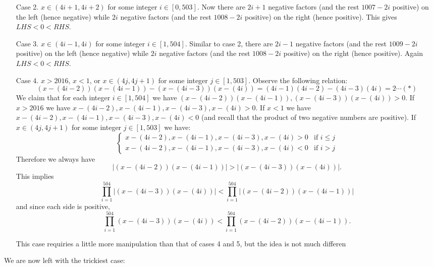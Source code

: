 \documentclass[11pt,a4paper]{article}
\begin{document}
\begin{itemize}
\begin{itemize}
\item [Case 2.] $x\in (4i+1, 4i+2)$ for some integer $i\in [0, 503]$. 
Now there are $2i+1$ negative factors (and the rest $1007-2i$ positive) on the left (hence negative) while $2i$ negative factors (and the rest $1008-2i$ positive) on the right (hence positive). This gives $LHS<0<RHS$.

\item [Case 3.] $x\in (4i-1, 4i)$ for some integer $i\in [1, 504]$. 
Similar to case 2, there are $2i-1$ negative factors (and the rest $1009-2i$ positive) on the left (hence negative) while $2i$ negative factors (and the rest $1008-2i$ positive) on the right (hence positive). 
Again $LHS<0<RHS$. 

\item [Case 4.] $x>2016$, $x<1$, or $x\in (4j, 4j+1)$ for some integer $j\in [1, 503]$. 
Observe the following relation:
$$(x-(4i-2))(x-(4i-1))-(x-(4i-3))(x-(4i))=(4i-1)(4i-2)-(4i-3)(4i)=2\cdots (*)$$ 
We claim that for each integer $i\in [1, 504]$ we have 
$(x-(4i-2))(x-(4i-1)), (x-(4i-3))(x-(4i))>0$. 
If $x>2016$ we have $x-(4i-2), x-(4i-1), x-(4i-3), x-(4i) >0$. 
If $x<1$ we have $x-(4i-2), x-(4i-1), x-(4i-3), x-(4i) <0$ (and recall that the product of two negative numbers are positive). 
If $x\in (4j, 4j+1)$ for some integer $j\in [1, 503]$ we have: 
$$\begin{cases} 
x-(4i-2), x-(4i-1), x-(4i-3), x-(4i) >0 & \text{if } i\le j \\ 
x-(4i-2), x-(4i-1), x-(4i-3), x-(4i) <0 & \text{if } i > j 
\end{cases} $$
Therefore we always have 
$$|(x-(4i-2))(x-(4i-1))|>|(x-(4i-3))(x-(4i))|.$$ 
This implies 
$$\displaystyle\prod_{i=1}^{504} |(x-(4i-3))(x-(4i))|<\displaystyle\prod_{i=1}^{504} |(x-(4i-2))(x-(4i-1))|$$ 
and since each side is positive, 
$$\displaystyle\prod_{i=1}^{504} (x-(4i-3))(x-(4i))<\displaystyle\prod_{i=1}^{504} (x-(4i-2))(x-(4i-1)).$$ 

This case requiries a little more manipulation than that of cases 4 and 5, but the idea is not much differen
\end{itemize}

We are now left with the trickiest case: 
\begin{itemize}


\end{itemize}
\end{itemize}
\end{document}
